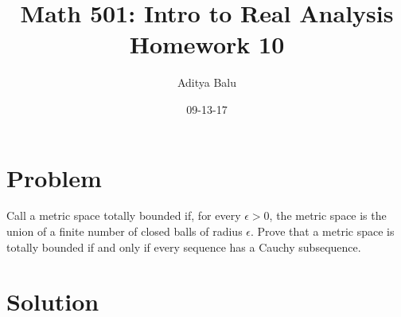 \documentclass[]{article}
\title{Math 501: Intro to Real Analysis\\Homework 10}
\date{09-13-17}
\author{Aditya Balu}
\begin{document}
\maketitle

\section*{Problem}
Call a metric space totally bounded if, for every $\epsilon >0$, the metric space is the union of a finite number of closed balls of radius $\epsilon$. Prove that a metric space is totally bounded if and only if every sequence has a Cauchy subsequence.
\section*{Solution}
\end{document}
